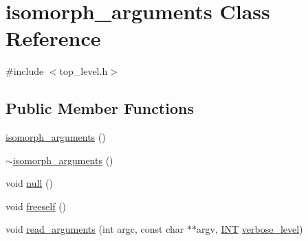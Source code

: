 \hypertarget{classisomorph__arguments}{}\section{isomorph\+\_\+arguments Class Reference}
\label{classisomorph__arguments}


{\ttfamily \#include $<$top\+\_\+level.\+h$>$}

\subsection*{Public Member Functions}
\begin{DoxyCompactItemize}
\item 
\mbox{\hyperlink{classisomorph__arguments_a10286ca1b855d2b870afb88eaf5b7d6a}{isomorph\+\_\+arguments}} ()
\item 
\mbox{\hyperlink{classisomorph__arguments_ae46637de6ebb25db1ce92bc16d95bf88}{$\sim$isomorph\+\_\+arguments}} ()
\item 
void \mbox{\hyperlink{classisomorph__arguments_afa55a961ada1e13cb3b9a2e9fb035050}{null}} ()
\item 
void \mbox{\hyperlink{classisomorph__arguments_a3cbfff6836348e1d9ab4333a995ae3af}{freeself}} ()
\item 
void \mbox{\hyperlink{classisomorph__arguments_a0a5da0b31bb09f9a685a44070222afa2}{read\+\_\+arguments}} (int argc, const char $\ast$$\ast$argv, \mbox{\hyperlink{galois_8h_a09fddde158a3a20bd2dcadb609de11dc}{I\+NT}} \mbox{\hyperlink{simeon_8_c_a818073fbcc2f439e7c56952f67386122}{verbose\+\_\+level}})
\item 
$$
\end{DoxyCompactItemize}

